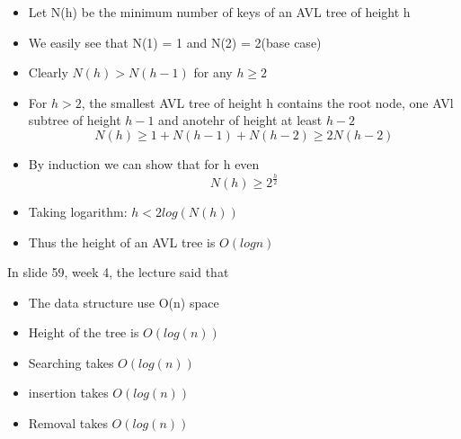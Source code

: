\documentclass{article}
\begin{document}
	\begin{itemize}
		\item Let N(h) be the minimum number of keys of an AVL tree of height h
		\item We easily see that N(1) = 1 and N(2) = 2(base case)
		\item Clearly \(N(h) > N(h - 1)\) for any \(h \geq 2\)
		\item For \(h > 2\), the smallest AVL tree of height h contains the root node, one AVl subtree of height \(h - 1\) and anotehr of height at least \(h - 2\)
		\[N(h) \geq 1 + N(h - 1) + N(h - 2) \geq 2N(h - 2)\]
		\item By induction we can show that for h even
		\[N(h) \geq 2^{\frac{h}{2}}\]
		\item Taking logarithm: \(h < 2 log(N(h))\)
		\item Thus the height of an AVL tree is \(O(logn)\)
	\end{itemize}

	In slide 59, week 4, the lecture said that
	\begin{itemize}
		\item The data structure use O(n) space
		\item Height of the tree is \(O(log(n))\)
		\item Searching takes \(O(log(n))\)
		\item insertion takes \(O(log(n))\)
		\item Removal takes \(O(log(n))\)
	\end{itemize}
\end{document}

